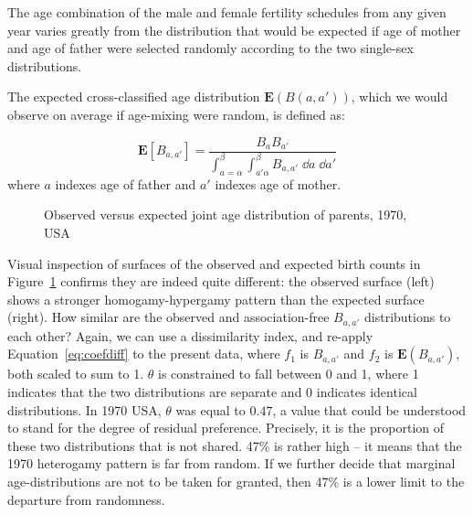  \FloatBarrier
The age combination of the male and female fertility schedules from
any given year varies greatly from the distribution that would be expected if
age of mother and age of father were selected randomly according to the two
single-sex distributions.

The expected cross-classified age distribution $\textbf{E}(B(a,a'))$, which
we would observe on average if age-mixing were random, is defined as:

\begin{equation}
\label{eq:expected}
\textbf{E}\left[B_{a,a'}\right] = \frac{B_a B_{a'}}{\int _{a = \alpha} ^\beta
\int _{a' \alpha} ^\beta B_{a,a'} \; \dd a \;\dd a'}
\end{equation}
where $a$ indexes age of father and $a'$ indexes age of mother.

\begin{figure}[ht!]
        \centering  
          \caption{Observed versus expected joint age distribution of
          parents, 1970, USA}
          \label{fig:US1970obsexp}
\end{figure}

Visual inspection of surfaces of the observed and expected birth counts in
Figure~\ref{fig:US1970obsexp} confirms they are indeed quite different: the
observed surface (left) shows a stronger homogamy-hypergamy pattern than the
expected surface (right). How similar are the
observed and association-free $B_{a,a'}$ distributions to each other? Again, we
can use a dissimilarity index, and re-apply Equation~\ref{eq:coefdiff} to the
present data, where $f_1$ is $B_{a,a'}$ and $f_2$ is $\textbf{E}(B_{a,a'})$, both scaled 
to sum to 1. $\theta$ is constrained to fall between 0 and 1, where 1 indicates that the
two distributions are separate and 0 indicates identical distributions. In 1970 USA,
$\theta$ was equal to $0.47$, a value that could be understood to stand for the
degree of residual preference. Precisely, it is the proportion of these two
distributions that is not shared. 47\% is rather high -- it means that the 1970
heterogamy pattern is far from random. If we further decide that marginal
age-distributions are not to be taken for granted, then 47\% is a lower limit to
the departure from randomness.

